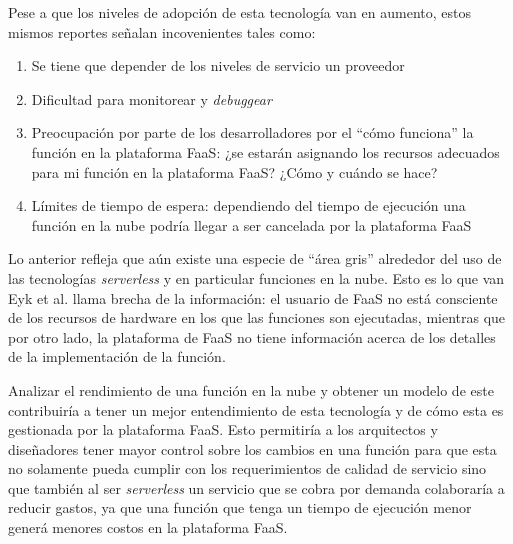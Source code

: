 Pese a que los niveles de adopción de esta tecnología van en aumento, estos mismos reportes señalan incovenientes tales como:
\begin{enumerate}
    \item Se tiene que depender de los niveles de servicio un proveedor
    \item Dificultad para monitorear y \emph{debuggear}
    \item Preocupación por parte de los desarrolladores por el ``cómo funciona'' la función en la plataforma FaaS: ¿se estarán asignando los recursos adecuados para mi función en la plataforma FaaS? ¿Cómo y cuándo se hace?
    \item Límites de tiempo de espera: dependiendo del tiempo de ejecución una función en la nube podría llegar a ser cancelada por la plataforma FaaS
\end{enumerate}

Lo anterior refleja que aún existe una especie de ``área gris'' alrededor del uso de las tecnologías \emph{serverless} y en particular funciones en la nube. Esto es lo que van Eyk et al.\cite{vanEyk:2018:SRC:3185768.3186308} llama brecha de la información: el usuario de FaaS no está consciente de los recursos de hardware en los que las funciones son ejecutadas, mientras que por otro lado, la plataforma de FaaS no tiene información acerca de los detalles de la implementación de la función.

Analizar el rendimiento de una función en la nube y obtener un modelo de este contribuiría a tener un mejor entendimiento de esta tecnología y de cómo esta es gestionada por la plataforma FaaS. Esto permitiría a los arquitectos y diseñadores tener mayor control sobre los cambios en una función para que esta no solamente pueda cumplir con los requerimientos de calidad de servicio sino que también al ser \emph{serverless} un servicio que se cobra por demanda colaboraría a reducir gastos, ya que una función que tenga un tiempo de ejecución menor generá menores costos en la plataforma FaaS.

